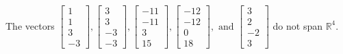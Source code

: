 \begin{exercise}
\begin{exerciseStatement}
  \end{exerciseStatement}
  \begin{exerciseAnswer}
   The vectors \(\left[\begin{array}{r}
1 \\
1 \\
3 \\
-3
\end{array}\right] , \left[\begin{array}{r}
3 \\
3 \\
-3 \\
-3
\end{array}\right] , \left[\begin{array}{r}
-11 \\
-11 \\
3 \\
15
\end{array}\right] , \left[\begin{array}{r}
-12 \\
-12 \\
0 \\
18
\end{array}\right] , \text{ and } \left[\begin{array}{r}
3 \\
2 \\
-2 \\
3
\end{array}\right]\) 
  	 do not  
	span \(\mathbb{R}^4\).
  


  \end{exerciseAnswer}
\end{exercise}